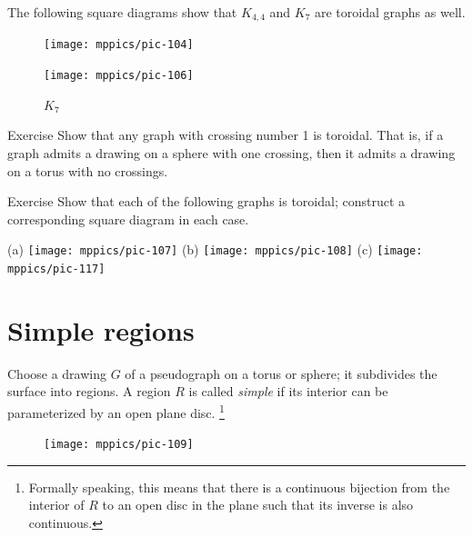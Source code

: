 The following square diagrams show that $K_{4,4}$ and $K_7$ are toroidal graphs as well.

\begin{figure}[ht!]
\begin{minipage}{.48\textwidth}
\centering
\texttt{[image: mppics/pic-104]}
\end{minipage}\hfill
\begin{minipage}{.48\textwidth}
\centering
\texttt{[image: mppics/pic-106]}\label{K5-toroidal}
\end{minipage}

\medskip

\begin{minipage}{.45\textwidth}
\centering
\caption*{$K_{4,4}$}
\end{minipage}\hfill
\begin{minipage}{.45\textwidth}
\centering
\caption*{$K_7$}
\end{minipage}
\vskip-4mm
\end{figure}




\begin{thm}{Exercise}\label{ex:crossing1}
Show that any graph with crossing number 1 is toroidal.
That is, if a graph admits a drawing on a sphere with one crossing, then it admits a drawing on a torus with no crossings.
\end{thm}


\begin{thm}{Exercise}\label{ex:toroidal-graphs}
Show that each of the following graphs is toroidal; construct a corresponding square diagram in each case.

(a) \texttt{[image: mppics/pic-107]}
(b) \texttt{[image: mppics/pic-108]}
(c) \texttt{[image: mppics/pic-117]}
\end{thm}


\section{Simple regions}

Choose a drawing $G$ of a pseudograph on a torus or sphere;
it subdivides the surface into regions.
A region $R$ is called \emph{simple} if its interior can be parameterized by an open plane disc.%
\footnote{Formally speaking, this means that there is a continuous bijection from the interior of $R$ to an open disc in the plane such that its inverse is also continuous.}

\begin{figure}
\vskip-6mm
\centering
\texttt{[image: mppics/pic-109]}
\end{figure}

